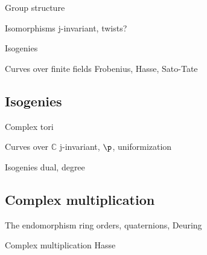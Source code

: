 \documentclass{beamer}
\newcommand{\C}{\mathbb{C}}
\begin{document}

\begin{frame}{Group structure}
  
\end{frame}


\begin{frame}{Isomorphisms}
  j-invariant, twists?
\end{frame}


\begin{frame}{Isogenies}
  
\end{frame}


\begin{frame}{Curves over finite fields}
  Frobenius, Hasse, Sato-Tate
\end{frame}


\subsection{Isogenies}

\begin{frame}{Complex tori}
  
\end{frame}


\begin{frame}{Curves over $\C$}
  j-invariant, $\p$, uniformization
\end{frame}


\begin{frame}{Isogenies}
  dual, degree
\end{frame}


\subsection{Complex multiplication}

\begin{frame}{The endomorphism ring}
  orders, quaternions, Deuring
\end{frame}


\begin{frame}{Complex multiplication}
  Hasse
\end{frame}
\end{document}
